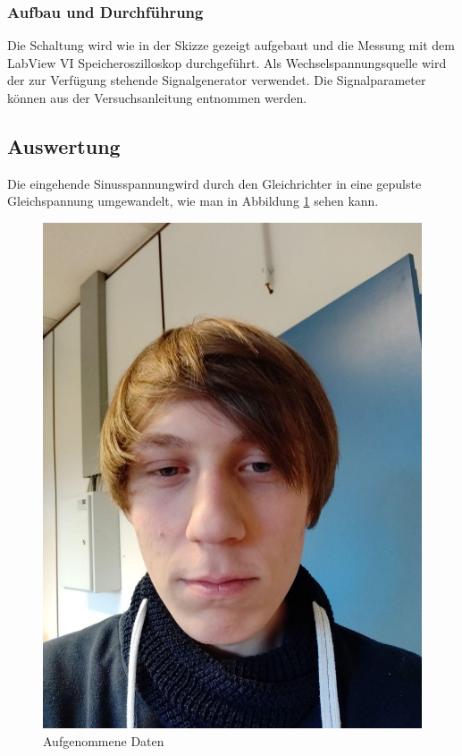 \documentclass[12pt,twoside,a4paper]{scrartcl}
\begin{document}
		\subsubsection{Aufbau und Durchführung}
			Die Schaltung wird wie in der Skizze gezeigt aufgebaut und die Messung mit dem LabView VI Speicheroszilloskop durchgeführt. Als Wechselspannungsquelle wird der zur Verfügung stehende Signalgenerator verwendet. Die Signalparameter können aus der Versuchsanleitung entnommen werden.

		\subsection{Auswertung}

			Die eingehende Sinusspannungwird durch den Gleichrichter in eine gepulste Gleichspannung umgewandelt, wie man in Abbildung \ref{Gleichrichter::Daten} sehen kann.

			\begin{figure}
				\centering

				\includegraphics[width = 0.8 \textwidth]{Pictures/Platzhalter}

				\caption{Aufgenommene Daten}
				\label{Gleichrichter::Daten}
			\end{figure}
\end{document}
